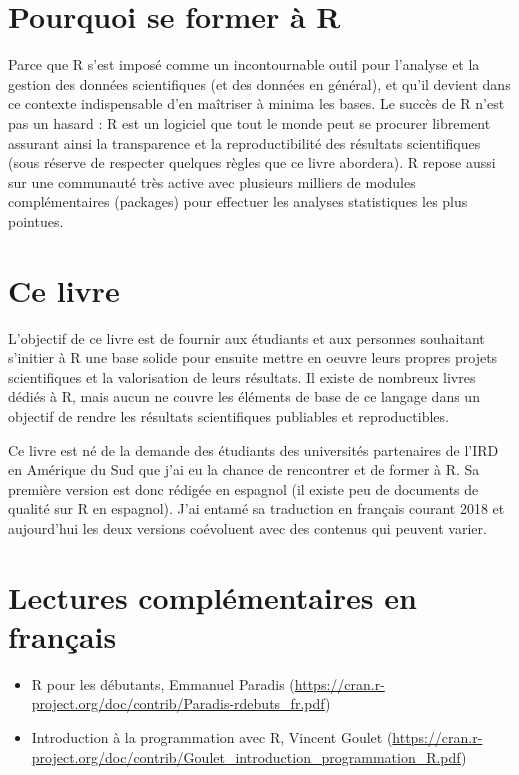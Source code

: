 \documentclass[]{book}
\providecommand{\tightlist}{%
  \setlength{\itemsep}{0pt}\setlength{\parskip}{0pt}}
\begin{document}
\hypertarget{pourquoi-se-former-a-r}{%
\section{Pourquoi se former à R}\label{pourquoi-se-former-a-r}}

Parce que R s'est imposé comme un incontournable outil pour l'analyse et la gestion des données scientifiques (et des données en général), et qu'il devient dans ce contexte indispensable d'en maîtriser à minima les bases. Le succès de R n'est pas un hasard : R est un logiciel que tout le monde peut se procurer librement assurant ainsi la transparence et la reproductibilité des résultats scientifiques (sous réserve de respecter quelques règles que ce livre abordera). R repose aussi sur une communauté très active avec plusieurs milliers de modules complémentaires (packages) pour effectuer les analyses statistiques les plus pointues.

\hypertarget{ce-livre}{%
\section{Ce livre}\label{ce-livre}}

L'objectif de ce livre est de fournir aux étudiants et aux personnes souhaitant s'initier à R une base solide pour ensuite mettre en oeuvre leurs propres projets scientifiques et la valorisation de leurs résultats. Il existe de nombreux livres dédiés à R, mais aucun ne couvre les éléments de base de ce langage dans un objectif de rendre les résultats scientifiques publiables et reproductibles.

Ce livre est né de la demande des étudiants des universités partenaires de l'IRD en Amérique du Sud que j'ai eu la chance de rencontrer et de former à R. Sa première version est donc rédigée en espagnol (il existe peu de documents de qualité sur R en espagnol). J'ai entamé sa traduction en français courant 2018 et aujourd'hui les deux versions coévoluent avec des contenus qui peuvent varier.

\hypertarget{lectures-complementaires-en-francais}{%
\section{Lectures complémentaires en français}\label{lectures-complementaires-en-francais}}

\begin{itemize}
\tightlist
\item
  R pour les débutants, Emmanuel Paradis (\url{https://cran.r-project.org/doc/contrib/Paradis-rdebuts_fr.pdf})
\item
  Introduction à la programmation avec R, Vincent Goulet (\url{https://cran.r-project.org/doc/contrib/Goulet_introduction_programmation_R.pdf})
\end{itemize}
\end{document}
